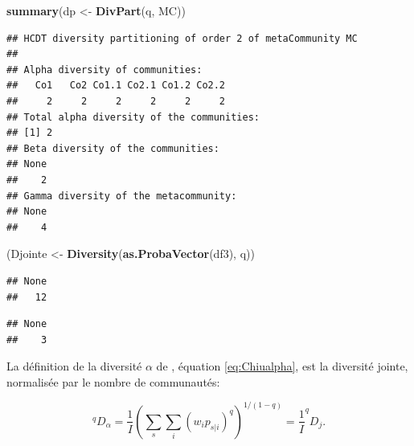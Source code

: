 \documentclass[
  11pt,
  french,
  a4paper,
  extrafontsizes,onecolumn,openright
  ]{memoir}
\newenvironment{Shaded}{\begin{snugshade}}{\end{snugshade}}
\newcommand{\KeywordTok}[1]{\textcolor[rgb]{0.13,0.29,0.53}{\textbf{#1}}}
\newcommand{\NormalTok}[1]{#1}
\newcommand{\OperatorTok}[1]{\textcolor[rgb]{0.81,0.36,0.00}{\textbf{#1}}}
\newcommand{\StringTok}[1]{\textcolor[rgb]{0.31,0.60,0.02}{#1}}
\begin{document}
\normalsize

\scriptsize

\begin{Shaded}
\begin{Highlighting}[]
\KeywordTok{summary}\NormalTok{(dp <-}\StringTok{ }\KeywordTok{DivPart}\NormalTok{(q, MC))}
\end{Highlighting}
\end{Shaded}

\begin{verbatim}
## HCDT diversity partitioning of order 2 of metaCommunity MC
## 
## Alpha diversity of communities: 
##   Co1   Co2 Co1.1 Co2.1 Co1.2 Co2.2 
##     2     2     2     2     2     2 
## Total alpha diversity of the communities: 
## [1] 2
## Beta diversity of the communities: 
## None 
##    2 
## Gamma diversity of the metacommunity: 
## None 
##    4
\end{verbatim}

\begin{Shaded}
\begin{Highlighting}[]
\NormalTok{(Djointe <-}\StringTok{ }\KeywordTok{Diversity}\NormalTok{(}\KeywordTok{as.ProbaVector}\NormalTok{(df3), q))}
\end{Highlighting}
\end{Shaded}

\begin{verbatim}
## None 
##   12
\end{verbatim}

\begin{Shaded}
\end{Shaded}

\begin{verbatim}
## None 
##    3
\end{verbatim}

\normalsize

La définition de la diversité \(\alpha\) de \textcite{Chiu2014}, équation \eqref{eq:Chiualpha}, est la diversité jointe, normalisée par le nombre de communautés:

\begin{equation}
  \label{eq:Chiualphajointe}
  ^{q}\!D_{\alpha}
  = \frac{1}{I} {\left(\sum_s{\sum_i{{\left(w_i p_{s|i}\right)}^q}}\right)}^{{1}/{\left(1-q\right)}}
  = \frac{1}{I} ^{q}\!D_{j}.
\end{equation}
\end{document}
